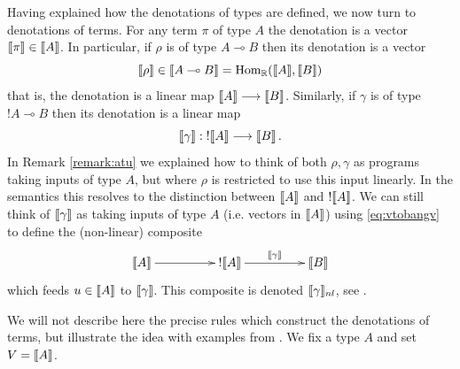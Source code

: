 \documentclass[english,letter paper,12pt,leqno]{article}
\theoremstyle{example}
\numberwithin{equation}{section}
\def\Hom{\operatorname{Hom}}
\def\be{\begin{equation}}
\def\ee{\end{equation}}
\DeclareMathOperator{\End}{End}
\begin{document}
Having explained how the denotations of types are defined, we now turn to denotations of terms. For any term $\pi$ of type $A$ the denotation is a vector $\llbracket \pi \rrbracket \in \llbracket A \rrbracket$. In particular, if $\rho$ is of type $A \multimap B$ then its denotation is a vector
\[
\den{\rho} \in \den{A \multimap B} = \Hom_{\mathbb{R}}(\den{A}, \den{B})
\]
that is, the denotation is a linear map $\llbracket A \rrbracket \longrightarrow \llbracket B \rrbracket$. Similarly, if $\gamma$ is of type ${!}A \multimap B$ then its denotation is a linear map
\[
\llbracket \gamma \rrbracket: {!} \llbracket A \rrbracket \longrightarrow \llbracket B \rrbracket\,.
\]
In Remark \ref{remark:atu} we explained how to think of both $\rho, \gamma$ as programs taking inputs of type $A$, but where $\rho$ is restricted to use this input linearly. In the semantics this resolves to the distinction between $\llbracket A \rrbracket$ and ${!} \llbracket A \rrbracket$. We can still think of $\llbracket \gamma \rrbracket$ as taking inputs of type $A$ (i.e. vectors in $\llbracket A \rrbracket$) using \eqref{eq:vtobangv} to define the (non-linear) composite
\be\label{eq:defnnl}
\xymatrix@C+2pc{
\den{A} \ar[r] & {!} \den{A} \ar[r]^-{\den{\gamma}} & \den{B}
}
\ee
which feeds $u \in \llbracket A \rrbracket$ to $\llbracket \gamma \rrbracket$. This composite is denoted $\llbracket \gamma \rrbracket_{nl}$, see \cite[Definition 5.10]{murfet_ll}.

We will not describe here the precise rules which construct the denotations of terms, but illustrate the idea with examples from \cite[\S 3]{murfetclift}. We fix a type $A$ and set $V = \llbracket A \rrbracket$.

\end{document}
